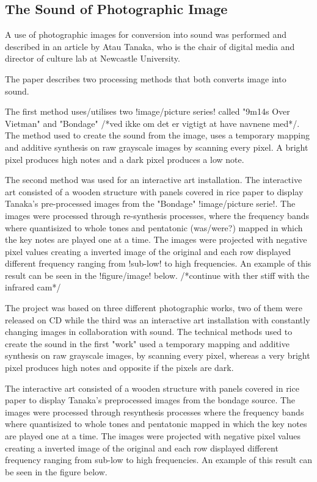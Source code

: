 \subsection{The Sound of Photographic Image}\label{sec:soundarticle}

A use of photographic images for conversion into sound was performed and described in an article by Atau Tanaka, who is the chair of digital media and director of culture lab at Newcastle University.

The paper describes two processing methods that both converts image into sound.

The first method uses/utilises two !image/picture series! called "9m14s Over Vietman" and "Bondage" /*ved ikke om det er vigtigt at have navnene med*/. The method used to create the sound from the image, uses a temporary mapping and additive synthesis on raw grayscale images by scanning every pixel. A bright pixel produces high notes and a dark pixel produces a low note.

The second method was used for an interactive art installation. The interactive art consisted of a wooden structure with panels covered in rice paper to display Tanaka's pre-processed images from the "Bondage" !image/picture serie!. The images were processed through re-synthesis processes, where the frequency bands where quantisized to whole tones and pentatonic (was/were?) mapped in which the key notes are played one at a time. The images were projected with negative pixel values creating a inverted image of the original and each row displayed different frequency ranging from !sub-low! to high frequencies. An example of this result can be seen in the !figure/image! below. /*continue with ther stiff with the infrared cam*/


The project was based on three different photographic works, two of them were released on CD while the third was an interactive art installation with constantly changing images in collaboration with sound. The technical methods used to create the sound in the first "work" used a temporary mapping and additive synthesis on raw grayscale images, by scanning every pixel, whereas a very bright pixel produces high notes and opposite if the pixels are dark. 

The interactive art consisted of a wooden structure with panels covered in rice paper to display Tanaka's preprocessed images from the bondage source. The images were processed through resynthesis processes where the frequency bands where quantisized to whole tones and pentatonic mapped in which the key notes are played one at a time. The images were projected with negative pixel values creating a inverted image of the original and each row displayed different frequency ranging from sub-low to high frequencies. An example of this result can be seen in the figure below. 

